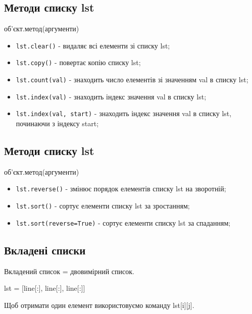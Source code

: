 \subsection{Методи списку lst} 
\begin{frame}
\begin{center}
об'єкт.метод(аргументи)
\end{center}
\begin{itemize}
        \item<1-> \texttt{lst.clear()} - видаляє всі елементи зі списку lst;
        \item<2-> \texttt{lst.copy()} - повертає копію списку lst;
        \item<3-> \texttt{lst.count(val)} - знаходить число елементів зі значенням val в списку lst;
        \item<4-> \texttt{lst.index(val)} - знаходить індекс значення val в списку lst;
        \item<4-> \texttt{lst.index(val, start)} - знаходить індекс значення val в списку lst, починаючи з індексу start;
    \end{itemize}
\end{frame}

\subsection{Методи списку lst} 
\begin{frame}
\begin{center}
об'єкт.метод(аргументи)
\end{center}
\begin{itemize}
        \item<1-> \texttt{lst.reverse()} - змінює порядок елементів списку lst на зворотній;
        \item<2-> \texttt{lst.sort()} - сортує елементи списку lst за зростанням;
        \item<2-> \texttt{lst.sort(reverse=True)} - сортує елементи списку lst за спаданням;
    \end{itemize}
\end{frame}

\subsection{Вкладені списки} 
\begin{frame}
\begin{center}
Вкладений список = двовимірний список.

lst = [line[:], line[:], line[:]]

Щоб отримати один елемент використовуємо команду lst[i][j]. 
\end{center}

\end{frame}
